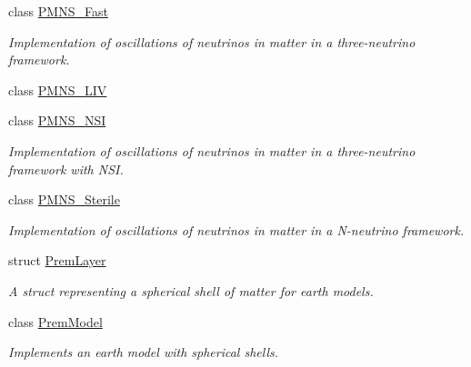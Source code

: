 \begin{DoxyCompactItemize}
class \hyperlink{classOscProb_1_1PMNS__Fast}{P\+M\+N\+S\+\_\+\+Fast}
\begin{DoxyCompactList}\small\item\em Implementation of oscillations of neutrinos in matter in a three-\/neutrino framework. \end{DoxyCompactList}\item 
class \hyperlink{classOscProb_1_1PMNS__LIV}{P\+M\+N\+S\+\_\+\+L\+IV}
\item 
class \hyperlink{classOscProb_1_1PMNS__NSI}{P\+M\+N\+S\+\_\+\+N\+SI}
\begin{DoxyCompactList}\small\item\em Implementation of oscillations of neutrinos in matter in a three-\/neutrino framework with N\+SI. \end{DoxyCompactList}\item 
class \hyperlink{classOscProb_1_1PMNS__Sterile}{P\+M\+N\+S\+\_\+\+Sterile}
\begin{DoxyCompactList}\small\item\em Implementation of oscillations of neutrinos in matter in a N-\/neutrino framework. \end{DoxyCompactList}\item 
struct \hyperlink{structOscProb_1_1PremLayer}{Prem\+Layer}
\begin{DoxyCompactList}\small\item\em A struct representing a spherical shell of matter for earth models. \end{DoxyCompactList}\item 
class \hyperlink{classOscProb_1_1PremModel}{Prem\+Model}
\begin{DoxyCompactList}\small\item\em Implements an earth model with spherical shells. \end{DoxyCompactList}\end{DoxyCompactItemize}
